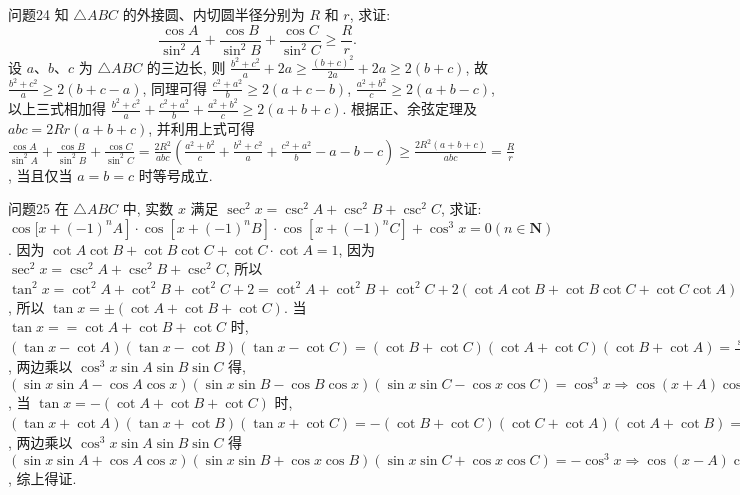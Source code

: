 问题24 知 $\triangle A B C$ 的外接圆、内切圆半径分别为 $R$ 和 $r$, 求证:
$$
\frac{\cos A}{\sin ^2 A}+\frac{\cos B}{\sin ^2 B}+\frac{\cos C}{\sin ^2 C} \geqslant \frac{R}{r} \text {. }
$$
设 $a 、 b 、 c$ 为 $\triangle A B C$ 的三边长, 则 $\frac{b^2+c^2}{a}+2 a \geqslant \frac{(b+c)^2}{2 a}+2 a \geqslant 2(b+c)$, 故 $\frac{b^2+c^2}{a} \geqslant 2(b+c-a)$, 同理可得 $\frac{c^2+a^2}{b} \geqslant 2(a+c-b)$, $\frac{a^2+b^2}{c} \geqslant 2(a+b-c)$, 以上三式相加得 $\frac{b^2+c^2}{a}+\frac{c^2+a^2}{b}+\frac{a^2+b^2}{c} \geqslant 2(a+ b+c)$. 根据正、余弦定理及 $a b c=2 R r(a+b+c)$, 并利用上式可得 $\frac{\cos A}{\sin ^2 A}+ \frac{\cos B}{\sin ^2 B}+\frac{\cos C}{\sin ^2 C}=\frac{2 R^2}{a b c}\left(\frac{a^2+b^2}{c}+\frac{b^2+c^2}{a}+\frac{c^2+a^2}{b}-a-b-c\right) \geqslant \frac{2 R^2(a+b+c)}{a b c}=\frac{R}{r}$, 当且仅当 $a=b=c$ 时等号成立.



问题25 在 $\triangle A B C$ 中, 实数 $x$ 满足 $\sec ^2 x=\csc ^2 A+\csc ^2 B+\csc ^2 C$, 求证: $\cos [x+ \left.(-1)^n A\right] \cdot \cos \left[x+(-1)^n B\right] \cdot \cos \left[x+(-1)^n C\right]+\cos ^3 x=0(n \in \mathbf{N})$.
因为 $\cot A \cot B+\cot B \cot C+\cot C \cdot \cot A=1$, 因为 $\sec ^2 x= \csc ^2 A+\csc ^2 B+\csc ^2 C$, 所以 $\tan ^2 x=\cot ^2 A+\cot ^2 B+\cot ^2 C+2=\cot ^2 A+ \cot ^2 B+\cot ^2 C+2(\cot A \cot B+\cot B \cot C+\cot C \cot A)=(\cot A+\cot B+ \cot C)^2$, 所以 $\tan x= \pm(\cot A+\cot B+\cot C)$. 当 $\tan x==\cot A+\cot B+ \cot C$ 时, $(\tan x-\cot A)(\tan x-\cot B)(\tan x-\cot C)=(\cot B+\cot C) (\cot A+\cot C)(\cot B+\cot A)=\frac{\sin (B+C)}{\sin B \sin C} \cdot \frac{\sin (A+C)}{\sin A \sin C} \cdot \frac{\sin (A+B)}{\sin A \sin B}= \frac{1}{\sin A \sin B \sin C}$, 两边乘以 $\cos ^3 x \sin A \sin B \sin C$ 得, $(\sin x \sin A-\cos A \cos x) (\sin x \sin B-\cos B \cos x)(\sin x \sin C-\cos x \cos C)=\cos ^3 x \Rightarrow \cos (x+A) \cos (x+B) \cos (x+C)+\cos ^3 x=0$, 当 $\tan x=-(\cot A+\cot B+\cot C)$ 时, $(\tan x+\cot A)(\tan x+\cot B)(\tan x+\cot C)=-(\cot B+\cot C)(\cot C+ \cot A)(\cot A+\cot B)=-\frac{\sin (B+C)}{\sin B \sin C} \cdot \frac{\sin (C+A)}{\sin C \sin A} \cdot \frac{\sin (A+B)}{\sin A \sin B}= -\frac{1}{\sin A \sin B \sin C}$, 两边乘以 $\cos ^3 x \sin A \sin B \sin C$ 得 $(\sin x \sin A+\cos A \cos x)(\sin x \sin B+\cos x \cos B)(\sin x \sin C+\cos x \cos C)=-\cos ^3 x \Rightarrow \cos (x- A) \cos (x-B) \cos (x-C)+\cos ^3 x=0$, 综上得证.



